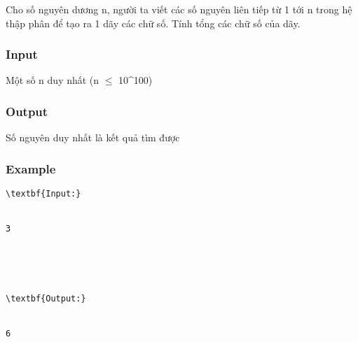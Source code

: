 



   Cho số nguyên dương n, người ta viết các số nguyên liên tiếp từ 1 tới n trong hệ thập phân để tạo ra 1 dãy các chữ số. Tính tổng các chữ số của dãy.  

\subsubsection{   Input  }

   Một số n duy nhất (n  $\le$  10^100)  

\subsubsection{   Output  }

   Số nguyên duy nhất là kết quả tìm được  

\subsubsection{   Example  }
\begin{verbatim}
\textbf{Input:}


3





\textbf{Output:}


6


\end{verbatim}
